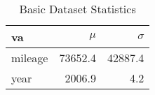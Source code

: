 \begin{table}[ht]
\centering
\begin{tabular}{lrr}
  \hline
va & $\mu$ & $\sigma$ \\ 
  \hline
mileage & 73652.4 & 42887.4 \\ 
  year & 2006.9 & 4.2 \\ 
   \hline
\end{tabular}
\caption{Basic Dataset Statistics} 
\label{tab:data_scale}
\end{table}
